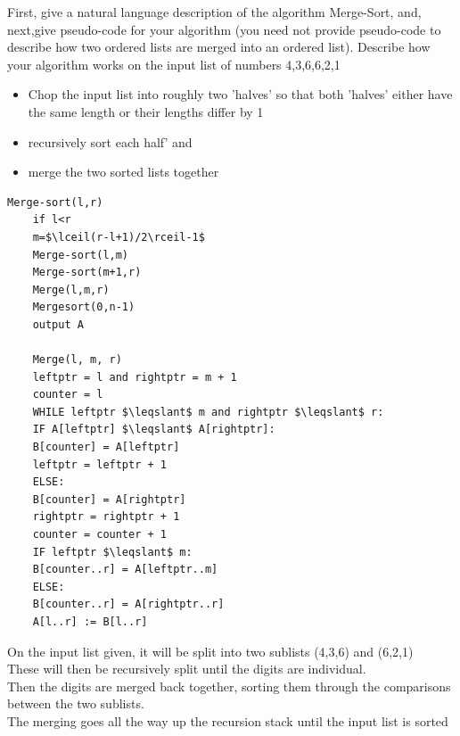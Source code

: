 \documentclass[addpoints]{exam}
\begin{document}
\begin{questions}
\droptotalpoints
\question[14]First, give a natural language description of the algorithm Merge-Sort, and, next,give pseudo-code for your algorithm (you need not provide pseudo-code to describe how two ordered lists are merged into an ordered list). Describe how your algorithm works on the input list of numbers 4,3,6,6,2,1
\begin{solution}[2in]
	\begin{itemize}
		\item Chop the input list into roughly two 'halves' so that both 'halves' either have the same length or their lengths differ by 1
		\item recursively sort each half' and
		\item merge the two sorted lists together
	\end{itemize}
	\begin{lstlisting}[mathescape=true]
	Merge-sort(l,r)
	if l<r
	m=$\lceil(r-l+1)/2\rceil-1$
	Merge-sort(l,m)
	Merge-sort(m+1,r)
	Merge(l,m,r)
	Mergesort(0,n-1)
	output A
	
	Merge(l, m, r)
	leftptr = l and rightptr = m + 1
	counter = l
	WHILE leftptr $\leqslant$ m and rightptr $\leqslant$ r:
	IF A[leftptr] $\leqslant$ A[rightptr]:
	B[counter] = A[leftptr]
	leftptr = leftptr + 1
	ELSE:
	B[counter] = A[rightptr]
	rightptr = rightptr + 1
	counter = counter + 1
	IF leftptr $\leqslant$ m:
	B[counter..r] = A[leftptr..m]
	ELSE:
	B[counter..r] = A[rightptr..r]
	A[l..r] := B[l..r]
	\end{lstlisting}
	On the input list given, it will be split into two sublists (4,3,6) and (6,2,1)\\
	These will then be recursively split until the digits are individual.\\
	Then the digits are merged back together, sorting them through the comparisons between the two sublists.\\
	The merging goes all the way up the recursion stack until the input list is sorted
\end{solution}


\end{questions}
\end{document}
